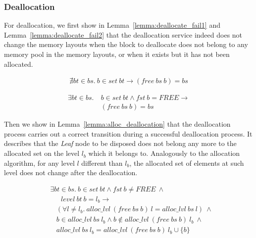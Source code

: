 \subsubsection{Deallocation}\label{sec:functionalDealloc}
For deallocation, we first show in Lemma~\ref{lemma:deallocate_fail1} and Lemma~\ref{lemma:deallocate_fail2} that the deallocation service indeed does not change the memory layouts when the block to deallocate does not belong to any memory pool in the memory layouts, or when it exists but it has not been allocated.

\begin{lemma} 
\label{lemma:deallocate_fail1}
\begin{align*}
\nexists bt \in bs.\ b \in set\ bt \longrightarrow (free\ bs\ b) = bs
\end{align*}
\end{lemma}
	
\begin{lemma} 
\label{lemma:deallocate_fail2}
\begin{align*}
\exists bt \in bs.\ &b\in set\ bt \wedge fst\ b = FREE \longrightarrow \\ 
&(free\ bs\ b) = bs
\end{align*}
\end{lemma}

Then we show in Lemma~\ref{lemma:alloc_deallocation} that the deallocation process carries out a correct transition during a successful deallocation process. It describes that the \emph{Leaf} node to be disposed does not belong any more to the allocated set on the level $l_b$ which it belongs to. Analogously to the allocation algorithm, for any level $l$ different than $l_b$, the allocated set of elements at such level does not change after the deallocation.

\begin{lemma} 
\label{lemma:alloc_deallocation}
\end{lemma}
\vspace{-7pt}
\begin{align*}
&\exists bt \in bs.\ b \in set\ bt \wedge fst\ b \neq FREE\ \wedge\\
&\ \ \ \ \ \ \ level\ bt\ b = l_b \longrightarrow\\
&\ \ \ \ (\forall l \ne l_b.\ alloc\_lvl\ (free\ bs\ b)\ l = alloc\_lvl\ bs\ l)\ \wedge\\
&\ \ \ \ b \in alloc \_lvl\ bs\ l_b \wedge b \notin alloc\_lvl\ (free\ bs\ b)\ l_b\ \wedge\\
&\ \ \ \ alloc\_lvl\ bs\ l_b = alloc\_lvl\ (free\ bs\ b)\ l_b \cup \lbrace b \rbrace
\end{align*}
\vspace{-12pt}

